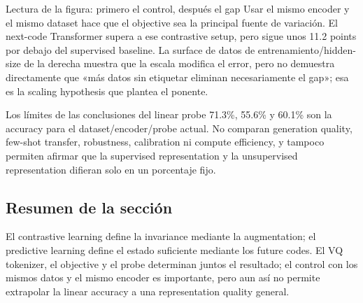 \begin{knowledgebox}{Lectura de la figura: primero el control, después el gap}
Usar el mismo encoder y el mismo dataset hace que el objective sea la principal fuente de variación. El next-code Transformer supera a ese contrastive setup, pero sigue unos 11.2 points por debajo del supervised baseline. La surface de datos de entrenamiento/hidden-size de la derecha muestra que la escala modifica el error, pero no demuestra directamente que «más datos sin etiquetar eliminan necesariamente el gap»; esa es la scaling hypothesis que plantea el ponente.
\end{knowledgebox}

\begin{warningbox}{Los límites de las conclusiones del linear probe}
71.3\%, 55.6\% y 60.1\% son la accuracy para el dataset/encoder/probe actual. No comparan generation quality, few-shot transfer, robustness, calibration ni compute efficiency, y tampoco permiten afirmar que la supervised representation y la unsupervised representation difieran solo en un porcentaje fijo.
\end{warningbox}


\subsection{Resumen de la sección}

El contrastive learning define la invariance mediante la augmentation; el predictive learning define el estado suficiente mediante los future codes. El VQ tokenizer, el objective y el probe determinan juntos el resultado; el control con los mismos datos y el mismo encoder es importante, pero aun así no permite extrapolar la linear accuracy a una representation quality general.
